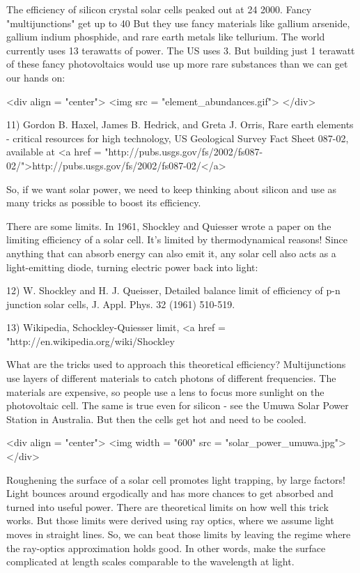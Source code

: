 The efficiency of silicon crystal solar cells peaked out at 24%
2000.  Fancy "multijunctions" get up to 40%
But they use fancy materials like gallium arsenide, gallium indium
phosphide, and rare earth metals like tellurium.  The world currently 
uses 13 terawatts of power.  The US uses 3.  But building just 1 terawatt of 
these fancy photovoltaics would use up more rare substances than we can get our
hands on:

<div align = "center">
<img src = "element_abundances.gif">
</div>

11) Gordon B. Haxel, James B. Hedrick, and Greta J. Orris, Rare earth 
elements - critical resources for high technology, US Geological Survey
Fact Sheet 087-02, available at <a href = "http://pubs.usgs.gov/fs/2002/fs087-02/">http://pubs.usgs.gov/fs/2002/fs087-02/</a>

So, if we want solar power, we need to keep thinking about silicon and
use as many tricks as possible to boost its efficiency.

There are some limits.  In 1961, Shockley and Quiesser wrote a paper
on the limiting efficiency of a solar cell.  It's limited by 
thermodynamical reasons!  Since anything that can absorb energy 
can also emit it, any solar cell also acts as a light-emitting diode,
turning electric power back into light:

12) W. Shockley and H. J. Queisser, Detailed balance limit of 
efficiency of p-n junction solar cells, J. Appl. Phys. 32 (1961)
510-519.

13) Wikipedia, Schockley-Quiesser limit, 
<a href = "http://en.wikipedia.org/wiki/Shockley%

What are the tricks used to approach this theoretical efficiency?
Multijunctions use layers of different materials to catch photons of
different frequencies.  The materials are expensive, so people use a
lens to focus more sunlight on the photovoltaic cell.  The same is true
even for silicon - see the Umuwa Solar Power Station in Australia.  
But then the cells get hot and need to be cooled.

<div align = "center">
<img width = "600" src = "solar_power_umuwa.jpg">
</div>

Roughening the surface of a solar cell promotes light trapping, by
large factors!  Light bounces around ergodically and has more chances
to get absorbed and turned into useful power.  There are theoretical
limits on how well this trick works.  But those limits were derived
using ray optics, where we assume light moves in straight lines.  So,
we can beat those limits by leaving the regime where the ray-optics
approximation holds good.  In other words, make the surface
complicated at length scales comparable to the wavelength at light.


